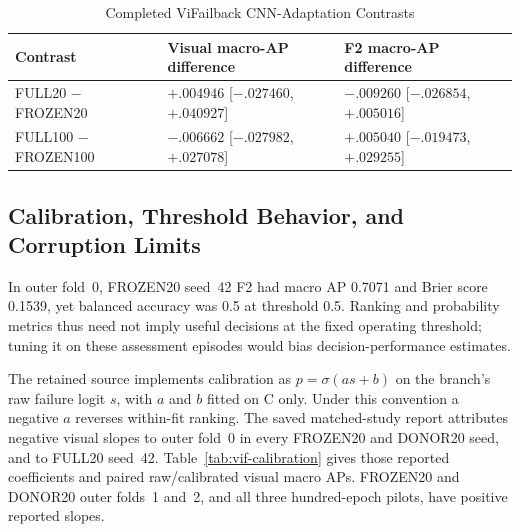 \begin{table}[htbp]
\caption{Completed ViFailback CNN-Adaptation Contrasts}\label{tab:vif-adaptation}
\centering\small
\begin{tabularx}{\linewidth}{@{}lYY@{}}\toprule
Contrast & Visual macro-AP difference & F2 macro-AP difference\\\midrule
FULL20 $-$ FROZEN20 & $+.004946$ [$-.027460$, $+.040927$] & $-.009260$ [$-.026854$, $+.005016$]\\
FULL100 $-$ FROZEN100 & $-.006662$ [$-.027982$, $+.027078$] & $+.005040$ [$-.019473$,
$+.029255$]\\\bottomrule
\end{tabularx}
\end{table}

\subsection{Calibration, Threshold Behavior, and Corruption Limits}
In outer fold~0, FROZEN20 seed~42 F2 had macro AP 0.7071 and Brier score 0.1539,
yet balanced accuracy was 0.5 at threshold 0.5. Ranking and probability metrics thus
need not imply useful decisions at the fixed operating threshold; tuning it on these
assessment episodes would bias decision-performance estimates.

The retained source implements calibration as $p=\sigma(a s+b)$ on the branch's raw
failure logit $s$, with $a$ and $b$ fitted on C only. Under this convention a negative
$a$ reverses within-fit ranking. The saved matched-study report attributes negative
visual slopes to outer fold~0 in every FROZEN20 and DONOR20 seed, and to FULL20
seed~42. Table~\ref{tab:vif-calibration} gives those reported coefficients and paired
raw/calibrated visual macro APs. FROZEN20 and DONOR20 outer folds~1 and~2, and all
three hundred-epoch pilots, have positive reported slopes.


